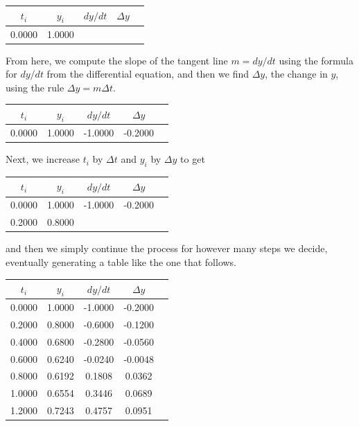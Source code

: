 \begin{center}
\begin{tabular}{|c|c|c|c|c|}
  \hline
  $t_i$&$y_i$&$dy/dt$&$\Delta y$\\
  \hline
  0.0000&1.0000&\hphantom{-1.0000} & \hphantom{-0.2000}\\
  \hline
\end{tabular}
\end{center}
\noindent
From here, we compute the slope of the tangent line $m=dy/dt$ using
the formula for $dy/dt$ from the differential 
equation, and then we find $\Delta y$, the change in $y$, using the rule $\Delta y = m\Delta t$.

\begin{center}
\begin{tabular}{|c|c|c|c|c|}
  \hline
  $t_i$&$y_i$&$dy/dt$&$\Delta y$\\
  \hline
  0.0000&1.0000&-1.0000&-0.2000\\
  \hline
\end{tabular}
\end{center}
\noindent
Next, we increase $t_i$ by $\Delta t$ and $y_i$ by $\Delta y$ to get
\noindent
\medskip
\begin{center}
\begin{tabular}{|c|c|c|c|c|}
  \hline
  $t_i$&$y_i$&$dy/dt$&$\Delta y$\\
  \hline
  0.0000&1.0000&-1.0000&-0.2000\\ \hline
  0.2000&0.8000& & \\
  \hline
\end{tabular}
\end{center}
\noindent
and then we simply continue the process for however many steps we decide, eventually generating a table like the one that follows.
\medskip
\begin{center}
\begin{tabular}{|c|c|c|c|c|}
  \hline
  $t_i$&$y_i$&$dy/dt$&$\Delta y$\\
  \hline
  0.0000&1.0000&-1.0000&-0.2000\\ \hline
  0.2000&0.8000&-0.6000&-0.1200\\ \hline
  0.4000&0.6800&-0.2800&-0.0560\\ \hline
  0.6000&0.6240&-0.0240&-0.0048\\ \hline
  0.8000&0.6192&0.1808&0.0362\\ \hline
  1.0000&0.6554&0.3446&0.0689\\ \hline
  1.2000&0.7243&0.4757&0.0951\\ 
  \hline
\end{tabular}
\end{center}



